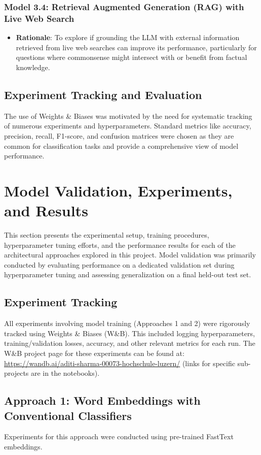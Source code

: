 \documentclass[10.5pt]{article}
\begin{document}
\subsubsection{Model 3.4: Retrieval Augmented Generation (RAG) with Live Web Search}
\begin{itemize}
    \item \textbf{Rationale}: To explore if grounding the LLM with external information retrieved from live web searches can improve its performance, particularly for questions where commonsense might intersect with or benefit from factual knowledge.
\end{itemize}

\subsection{Experiment Tracking and Evaluation}
The use of Weights \& Biases was motivated by the need for systematic tracking of numerous experiments and hyperparameters. Standard metrics like accuracy, precision, recall, F1-score, and confusion matrices were chosen as they are common for classification tasks and provide a comprehensive view of model performance.

\newpage
\section{Model Validation, Experiments, and Results}
This section presents the experimental setup, training procedures, hyperparameter tuning efforts, and the performance results for each of the architectural approaches explored in this project. Model validation was primarily conducted by evaluating performance on a dedicated validation set during hyperparameter tuning and assessing generalization on a final held-out test set.

\subsection{Experiment Tracking}
All experiments involving model training (Approaches 1 and 2) were rigorously tracked using Weights \& Biases (W\&B). This included logging hyperparameters, training/validation losses, accuracy, and other relevant metrics for each run. The W\&B project page for these experiments can be found at: \url{https://wandb.ai/aditi-sharma-00073-hochschule-luzern/} (links for specific sub-projects are in the notebooks).

\subsection{Approach 1: Word Embeddings with Conventional Classifiers}
Experiments for this approach were conducted using pre-trained FastText embeddings.
\end{document}
